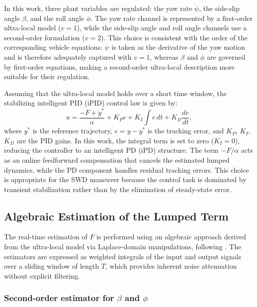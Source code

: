\documentclass[sn-chicago,iicol]{sn-jnl}
\theoremstyle{thmstyleone}%
\theoremstyle{thmstyletwo}%
\theoremstyle{thmstylethree}%
\begin{document}
In this work, three plant variables are regulated: the yaw rate 
$\dot{\psi}$, the side-slip angle $\beta$, and the roll angle $\phi$. 
The yaw rate channel is represented by a first-order ultra-local model 
($v = 1$), while the side-slip angle and roll angle channels use a 
second-order formulation ($v = 2$). This choice is consistent with the 
order of the corresponding vehicle equations: $\dot{\psi}$ is taken as 
the derivative of the yaw motion and is therefore adequately captured with 
$v=1$, whereas $\beta$ and $\phi$ are governed by first-order equations, 
making a second-order ultra-local description more suitable for their 
regulation.

Assuming that the ultra-local model holds over a short time window, 
the stabilizing intelligent PID (iPID) control law is given by:
\begin{equation}
    u = \frac{-F + \ddot{y}^*}{\alpha} + K_P e + K_I \int e \, dt 
        + K_D \frac{de}{dt},
    \label{Def-u-v2}
\end{equation}
where $y^*$ is the reference trajectory, $e = y - y^*$ is the tracking 
error, and $K_P$, $K_I$, $K_D$ are the PID gains. In this work, the 
integral term is set to zero ($K_I = 0$), reducing the controller to an 
intelligent PD (iPD) structure. The term $-F/\alpha$ acts as an online 
feedforward compensation that cancels the estimated lumped dynamics, 
while the PD component handles residual tracking errors.
This choice is appropriate for the SWD maneuver because the control task 
is dominated by transient stabilization rather than by the elimination 
of steady-state error.

\subsection{Algebraic Estimation of the Lumped 
            Term}\label{sec:estimators}

The real-time estimation of $F$ is performed using an algebraic approach 
derived from the ultra-local model via Laplace-domain manipulations, 
following \citet{Fliess2009}. The estimators are expressed as weighted 
integrals of the input and output signals over a sliding window of 
length $T$, which provides inherent noise attenuation without explicit 
filtering.

\subsubsection{Second-order estimator for $\beta$ and $\phi$}
\end{document}
